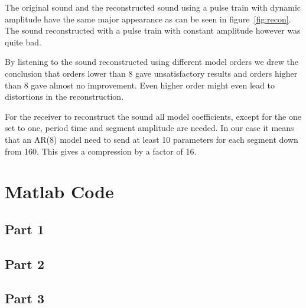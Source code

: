 \documentclass[10pt]{article}
\begin{document}
The original sound and the reconstructed sound using a pulse train
with dynamic amplitude have the same major appearance as can be seen in
figure~\ref{fig:recon}. The sound reconstructed with a pulse train with
constant amplitude however was quite bad.

By listening to the sound reconstructed using different model orders
we drew the conclusion that orders lower than $8$ gave unsatisfactory
results and orders higher than $8$ gave almost no improvement.
Even higher order might even lead to distortions in the reconstruction.

For the receiver to reconstruct the sound all model coefficients,
except for the one set to one, period time and segment amplitude are needed.
In our case it means that an AR(8) model need to send at least 10 parameters
for each segment down from 160. This gives a compression by a
factor of 16.

\newpage
\clearpage
\section*{Matlab Code}

\subsection*{Part 1}

\newpage
\subsection*{Part 2}

\newpage
\subsection*{Part 3}

\end{document}

